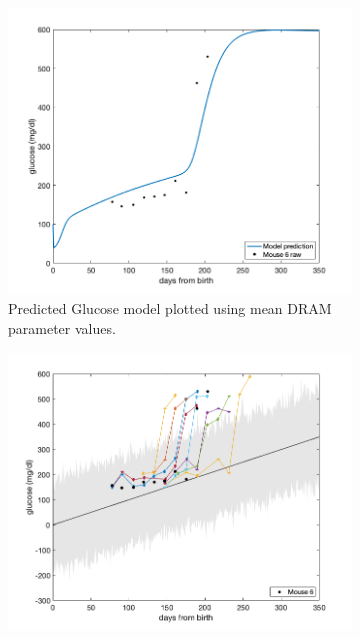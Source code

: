 \begin{figure}[H]
\centering
\begin{subfigure}{.7\textwidth}
    \centering
    \includegraphics[width=1\linewidth]{MCMC_figs/dram_t1d_final/jul10_mouse6_run1(noIC)_acute_NOD_waveOn_lietal_meanpred.png}
    \caption{Predicted Glucose model plotted using mean DRAM parameter values. }
    \label{fig:mouse6amcmc}
\end{subfigure}
\begin{subfigure}{.7\textwidth}
    \centering
    \includegraphics[width=1\linewidth]{MCMC_figs/dram_t1d_final/95_CI_mouse6.png}

\end{subfigure}
\end{figure}

